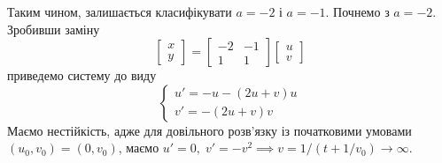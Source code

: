 \documentclass[12pt]{article} %
\begin{document}
	Таким чином, залишається класифікувати $a=-2$ і $a=-1$. Почнемо з $a=-2$. Зробивши заміну
	\[\begin{bmatrix}x\\y\end{bmatrix}=\begin{bmatrix}-2&-1\\1&1\end{bmatrix}\begin{bmatrix}u\\v\end{bmatrix}\]
	приведемо систему до виду
	\[\begin{cases}u'=-u-(2u+v)u\\v'=-(2u+v)v\end{cases}\]
	Маємо нестійкість, адже для довільного розв’язку із початковими умовами $(u_0,v_0)=(0,v_0)$, маємо $u'=0,\;v'=-v^2\implies
	v=1/(t+1/v_0)\to\infty$.
\end{document}
